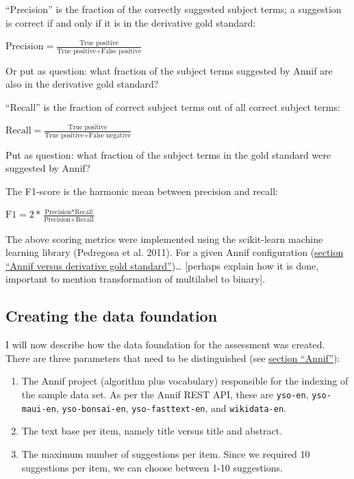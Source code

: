 ``Precision'' is the fraction of the correctly suggested subject terms;
a suggestion is correct if and only if it is in the derivative gold
standard:

\begin{center} 
$\text{Precision} = \displaystyle \frac{\text{True positive}}{\text{True positive} + \text{False positive}}$
\end{center}

Or put as question: what fraction of the subject terms suggested by
Annif are also in the derivative gold standard?

``Recall'' is the fraction of correct subject terms out of all correct
subject terms:

\begin{center} 
$\text{Recall} = \displaystyle \frac{\text{True positive}}{\text{True positive} + \text{False negative}}$
\end{center}

Put as question: what fraction of the subject terms in the gold standard
were suggested by Annif?

The F1-score is the harmonic mean between precision and recall:

\begin{center} 
$\text{F1} = \displaystyle 2 * \frac{\text{Precision} * \text{Recall}}{\text{Precision} + \text{Recall}}$
\end{center}

The above scoring metrics were implemented using the scikit-learn
machine learning library (Pedregosa et al. 2011). For a given Annif
configuration
(\protect\hyperlink{annif-versus-derivative-gold-standard}{section
``Annif versus derivative gold standard''})\ldots{} {[}perhaps explain
how it is done, important to mention transformation of multilabel to
binary{]}.

\hypertarget{creating-the-data-foundation}{%
\subsection{Creating the data
foundation}\label{creating-the-data-foundation}}

I will now describe how the data foundation for the assessment was
created. There are three parameters that need to be distinguished (see
\protect\hyperlink{annif}{section ``Annif''}):

\begin{enumerate}
\def\labelenumi{\arabic{enumi}.}
\tightlist
\item
  The Annif project (algorithm plus vocabulary) responsible for the
  indexing of the sample data set. As per the Annif REST API, these are
  \texttt{yso-en}, \texttt{yso-maui-en}, \texttt{yso-bonsai-en},
  \texttt{yso-fasttext-en}, and \texttt{wikidata-en}.
\item
  The text base per item, namely title versus title and abstract.
\item
  The maximum number of suggestions per item. Since we required 10
  suggestions per item, we can choose between 1-10 suggestions.
\end{enumerate}

